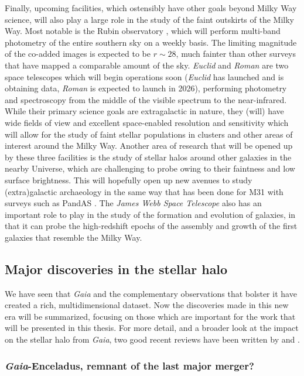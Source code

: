 Finally, upcoming facilities, which ostensibly have other goals beyond Milky Way science, will also play a large role in the study of the faint outskirts of the Milky Way. Most notable is the Rubin observatory \parencite{lsst}, which will perform multi-band photometry of the entire southern sky on a weekly basis. The limiting magnitude of the co-added images is expected to be $r \sim 28$, much fainter than other surveys that have mapped a comparable amount of the sky. \textit{Euclid} and \textit{Roman} are two space telescopes which will begin operations soon (\textit{Euclid} has launched and is obtaining data, \textit{Roman} is expected to launch in 2026), performing photometry and spectroscopy from the middle of the visible spectrum to the near-infrared. While their primary science goals are extragalactic in nature, they (will) have wide fields of view and excellent space-enabled resolution and sensitivity which will allow for the study of faint stellar populations in clusters and other areas of interest around the Milky Way. Another area of research that will be opened up by these three facilities is the study of stellar halos around other galaxies in the nearby Universe, which are challenging to probe owing to their faintness and low surface brightness. This will hopefully open up new avenues to study (extra)galactic archaeology in the same way that has been done for M31 with surveys such as PandAS \parencite{mcconnachie09}. The \textit{James Webb Space Telescope} also has an important role to play in the study of the formation and evolution of galaxies, in that it can probe the high-redshift epochs of the assembly and growth of the first galaxies that resemble the Milky Way.

\subsection{Major discoveries in the stellar halo}

We have seen that \textit{Gaia} and the complementary observations that bolster it have created a rich, multidimensional dataset. Now the discoveries made in this new era will be summarized, focusing on those which are important for the work that will be presented in this thesis. For more detail, and a broader look at the impact on the stellar halo from \textit{Gaia}, two good recent reviews have been written by \textcite{helmi20} and \textcite{deason24}.

\subsubsection{\textit{Gaia}-Enceladus, remnant of the last major merger?}

